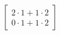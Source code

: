 \documentclass[preview]{standalone}
\begin{document}
\begin{align*}
\begin{bmatrix} 2 \cdot 1 + 1 \cdot 2 \\ 0 \cdot 1 + 1 \cdot 2 \end{bmatrix}
\end{align*}
\end{document}
